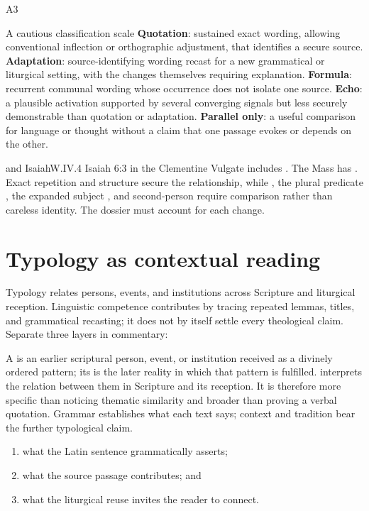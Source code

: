 \begin{courseunit}{A3}
\begin{grammarbox}{A cautious classification scale}
\textbf{Quotation}: sustained exact wording, allowing conventional inflection
or orthographic adjustment, that identifies a secure source.
\textbf{Adaptation}: source-identifying wording recast for a new grammatical or
liturgical setting, with the changes themselves requiring explanation.
\textbf{Formula}: recurrent communal wording whose occurrence does not isolate
one source. \textbf{Echo}: a plausible activation supported by several
converging signals but less securely demonstrable than quotation or adaptation.
\textbf{Parallel only}: a useful comparison for language or thought without a
claim that one passage evokes or depends on the other.
\end{grammarbox}

\begin{workedexample}{ and Isaiah}{W.IV.4}
Isaiah 6:3 in the Clementine Vulgate includes . The Mass has
. Exact repetition and structure secure the relationship, while
, the plural predicate , the expanded subject
, and second-person  require comparison rather
than careless identity. The dossier must account for each change.
\end{workedexample}

\section{Typology as contextual reading}

Typology relates persons, events, and institutions across Scripture and
liturgical reception. Linguistic competence contributes by tracing repeated
lemmas, titles, and grammatical recasting; it does not by itself settle every
theological claim. Separate three layers in commentary:

A  is an earlier scriptural person, event, or institution received
as a divinely ordered pattern; its  is the later reality in
which that pattern is fulfilled.  interprets the
relation between them in Scripture and its reception. It is therefore more
specific than noticing thematic similarity and broader than proving a verbal
quotation. Grammar establishes what each text says; context and tradition bear
the further typological claim.

\begin{enumerate}
  \item what the Latin sentence grammatically asserts;
  \item what the source passage contributes; and
  \item what the liturgical reuse invites the reader to connect.
\end{enumerate}



\end{courseunit}

